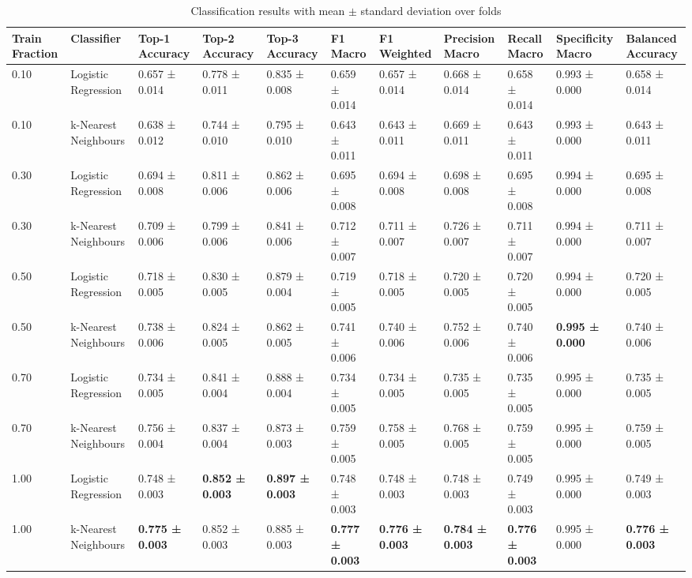 
\begin{table}[ht]
\centering
\tiny
\caption{Classification results with mean $\pm$ standard deviation over folds}
\label{tab:classification_results}
\begin{tabularx}{\textwidth}{lXXXXXXXXXX}
\toprule
Train Fraction & Classifier & Top-1 Accuracy & Top-2 Accuracy & Top-3 Accuracy & F1 Macro & F1 Weighted & Precision Macro & Recall Macro & Specificity Macro & Balanced Accuracy \\
\midrule
0.10 & Logistic Regression & 0.657 ± 0.014 & 0.778 ± 0.011 & 0.835 ± 0.008 & 0.659 ± 0.014 & 0.657 ± 0.014 & 0.668 ± 0.014 & 0.658 ± 0.014 & 0.993 ± 0.000 & 0.658 ± 0.014 \\
0.10 & k-Nearest Neighbours & 0.638 ± 0.012 & 0.744 ± 0.010 & 0.795 ± 0.010 & 0.643 ± 0.011 & 0.643 ± 0.011 & 0.669 ± 0.011 & 0.643 ± 0.011 & 0.993 ± 0.000 & 0.643 ± 0.011 \\
0.30 & Logistic Regression & 0.694 ± 0.008 & 0.811 ± 0.006 & 0.862 ± 0.006 & 0.695 ± 0.008 & 0.694 ± 0.008 & 0.698 ± 0.008 & 0.695 ± 0.008 & 0.994 ± 0.000 & 0.695 ± 0.008 \\
0.30 & k-Nearest Neighbours & 0.709 ± 0.006 & 0.799 ± 0.006 & 0.841 ± 0.006 & 0.712 ± 0.007 & 0.711 ± 0.007 & 0.726 ± 0.007 & 0.711 ± 0.007 & 0.994 ± 0.000 & 0.711 ± 0.007 \\
0.50 & Logistic Regression & 0.718 ± 0.005 & 0.830 ± 0.005 & 0.879 ± 0.004 & 0.719 ± 0.005 & 0.718 ± 0.005 & 0.720 ± 0.005 & 0.720 ± 0.005 & 0.994 ± 0.000 & 0.720 ± 0.005 \\
0.50 & k-Nearest Neighbours & 0.738 ± 0.006 & 0.824 ± 0.005 & 0.862 ± 0.005 & 0.741 ± 0.006 & 0.740 ± 0.006 & 0.752 ± 0.006 & 0.740 ± 0.006 & \textbf{0.995 ± 0.000} & 0.740 ± 0.006 \\
0.70 & Logistic Regression & 0.734 ± 0.005 & 0.841 ± 0.004 & 0.888 ± 0.004 & 0.734 ± 0.005 & 0.734 ± 0.005 & 0.735 ± 0.005 & 0.735 ± 0.005 & 0.995 ± 0.000 & 0.735 ± 0.005 \\
0.70 & k-Nearest Neighbours & 0.756 ± 0.004 & 0.837 ± 0.004 & 0.873 ± 0.003 & 0.759 ± 0.005 & 0.758 ± 0.005 & 0.768 ± 0.005 & 0.759 ± 0.005 & 0.995 ± 0.000 & 0.759 ± 0.005 \\
1.00 & Logistic Regression & 0.748 ± 0.003 & \textbf{0.852 ± 0.003} & \textbf{0.897 ± 0.003} & 0.748 ± 0.003 & 0.748 ± 0.003 & 0.748 ± 0.003 & 0.749 ± 0.003 & 0.995 ± 0.000 & 0.749 ± 0.003 \\
1.00 & k-Nearest Neighbours & \textbf{0.775 ± 0.003} & 0.852 ± 0.003 & 0.885 ± 0.003 & \textbf{0.777 ± 0.003} & \textbf{0.776 ± 0.003} & \textbf{0.784 ± 0.003} & \textbf{0.776 ± 0.003} & 0.995 ± 0.000 & \textbf{0.776 ± 0.003} \\
\bottomrule
\bottomrule
\end{tabularx}
\end{table}
